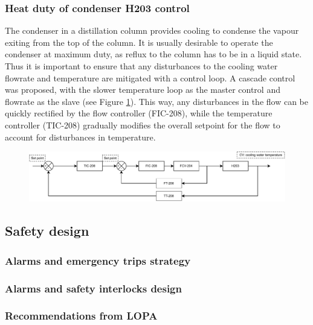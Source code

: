 \subsubsection{Heat duty of condenser H203 control}%
The condenser in a distillation column provides cooling to condense the vapour exiting from the top of the column. It is usually desirable to operate the condenser at maximum duty, as reflux to the column has to be in a liquid state. Thus it is important to ensure that any disturbances to the cooling water flowrate and temperature are mitigated with a control loop. A cascade control was proposed, with the slower temperature loop as the master control and flowrate as the slave (see Figure \ref{fig:S203C-TC}). This way, any disturbances in the flow can be quickly rectified by the flow controller (FIC-208), while the temperature controller (TIC-208) gradually modifies the overall setpoint for the flow to account for disturbances in temperature.

\begin{figure}[H]
    \centering
    \includegraphics[width=0.8\linewidth]{chapters/4-operation-control/4-Figures/H203-TC.pdf}
    \caption{}
    \label{fig:S203C-TC}
\end{figure}


\subsection{Safety design} %

\subsubsection{Alarms and emergency trips strategy}

\subsubsection{Alarms and safety interlocks design}

\subsubsection{Recommendations from LOPA} %
